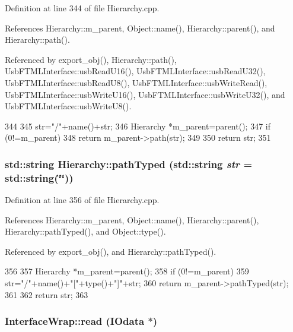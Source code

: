 Definition at line 344 of file Hierarchy.cpp.

References Hierarchy::m\_\-parent, Object::name(), Hierarchy::parent(), and Hierarchy::path().

Referenced by export\_\-obj(), Hierarchy::path(), UsbFTMLInterface::usbReadU16(), UsbFTMLInterface::usbReadU32(), UsbFTMLInterface::usbReadU8(), UsbFTMLInterface::usbWriteRead(), UsbFTMLInterface::usbWriteU16(), UsbFTMLInterface::usbWriteU32(), and UsbFTMLInterface::usbWriteU8().


\begin{DoxyCode}
344                                       {
345   str="/"+name()+str;
346   Hierarchy *m_parent=parent();
347   if (0!=m_parent){
348     return m_parent->path(str);
349   }
350   return str;
351 }
\end{DoxyCode}
\hypertarget{classHierarchy_a1efd56cd164d328d2002e53a10a19b8c}{
\subsubsection[{pathTyped}]{\setlength{\rightskip}{0pt plus 5cm}std::string Hierarchy::pathTyped (std::string {\em str} = {\ttfamily std::string(\char`\"{}\char`\"{})})}}
\label{classHierarchy_a1efd56cd164d328d2002e53a10a19b8c}


Definition at line 356 of file Hierarchy.cpp.

References Hierarchy::m\_\-parent, Object::name(), Hierarchy::parent(), Hierarchy::pathTyped(), and Object::type().

Referenced by export\_\-obj(), and Hierarchy::pathTyped().


\begin{DoxyCode}
356                                            {
357   Hierarchy *m_parent=parent();
358   if (0!=m_parent){
359     str="/"+name()+"["+type()+"]"+str;
360     return m_parent->pathTyped(str);
361   }
362   return str;
363 }
\end{DoxyCode}
\hypertarget{structInterfaceWrap_a4dd40213e6d37c73521450aa0c7a8f4d}{
\subsubsection[{read}]{ InterfaceWrap::read ({\bf IOdata} $\ast$)}}
\label{structInterfaceWrap_a4dd40213e6d37c73521450aa0c7a8f4d}


